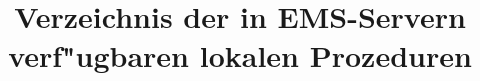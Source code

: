 \documentclass[11pt,a4paper]{article}
\title{Verzeichnis der in EMS-Servern verf"ugbaren lokalen Prozeduren}
\begin{document}
\maketitle

\tableofcontents

%
%
%
%
%
%

%
%
%
%
%
%
%
%




\def\indexname{Verzeichnis der Prozeduren}
\printindex
\end{document}
